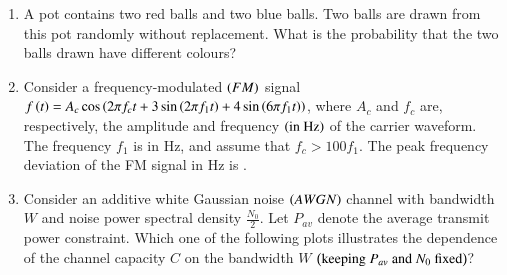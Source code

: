 \documentclass[journal,12pt,onecolumn]{IEEEtran}
\theoremstyle{remark}
\begin{document}
\begin{enumerate}
\item A pot contains two red balls and two blue balls. Two balls are drawn from this pot randomly without replacement. What is the probability that the two balls drawn have different colours?

\hfill{}

\begin{enumerate}
\end{enumerate}

\item Consider a frequency-modulated $\left(FM\right)$ signal $f\left(t\right) = A_c \cos\left(2\pi f_c t + 3 \sin\left(2\pi f_1 t\right) + 4 \sin\left(6\pi f_1 t\right)\right)$, where $A_c$ and $f_c$ are, respectively, the amplitude and frequency $\left(\text{in Hz}\right)$ of the carrier waveform. The frequency $f_1$ is in Hz, and assume that $f_c > 100f_1$. The peak frequency deviation of the FM signal in Hz is \underline{\hspace{2cm}}.

\hfill{}

\begin{enumerate}
\end{enumerate}

\item Consider an additive white Gaussian noise $\left(AWGN\right)$ channel with bandwidth $W$ and noise power spectral density $\frac{N_0}{2}$. Let $P_{av}$ denote the average transmit power constraint. Which one of the following plots illustrates the dependence of the channel capacity $C$ on the bandwidth $W$ $\left(\text{keeping } P_{av} \text{ and } N_0 \text{ fixed}\right)$?

\hfill{}


\end{enumerate}
\end{document}
